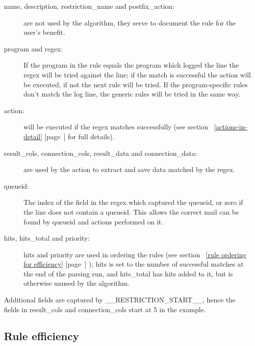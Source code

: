 \documentclass[a4paper,12pt,draft]{article}
\newcommand{\refwithpage}[1]{%
    \empty{}\ref{#1} [page~\pageref{#1}]%
}
\begin{document}
\begin{description}

    \item [name, description, restriction\_name and postfix\_action:] are
        not \newline used by the algorithm, they serve to document the rule
        for the user's benefit.

    \item [program and regex:] If the program in the rule equals the
        program which logged the line the regex will be tried against the
        line; if the match is successful the action will be executed, if
        not the next rule will be tried.  If the program-specific rules
        don't match the log line, the generic rules will be tried in the
        same way.

    \item [action:] will be executed if the regex matches successfully (see
        section~\refwithpage{actions-in-detail} for full details).

    \item [result\_cols, connection\_cols, result\_data and
        connection\_data:] are \newline used by the action to extract and
        save data matched by the regex.

    \item [queueid:] The index of the field in the regex which captured the
        queueid, or zero if the line does not contain a queueid.  This
        allows the correct mail can be found by queueid and actions
        performed on it.

    \item [hits, hits\_total and priority:] hits and priority are used in
        ordering the rules (see section~\refwithpage{rule ordering for
        efficiency}); hits is set to the number of successful matches at
        the end of the parsing run, and hits\_total has hits added to it,
        but is otherwise unused by the algorithm.

\end{description}

Additional fields are captured by \_\_RESTRICTION\_START\_\_, hence the
fields in result\_cols and connection\_cols start at 5 in the example.

        
\subsection{Rule efficiency}
\end{document}
